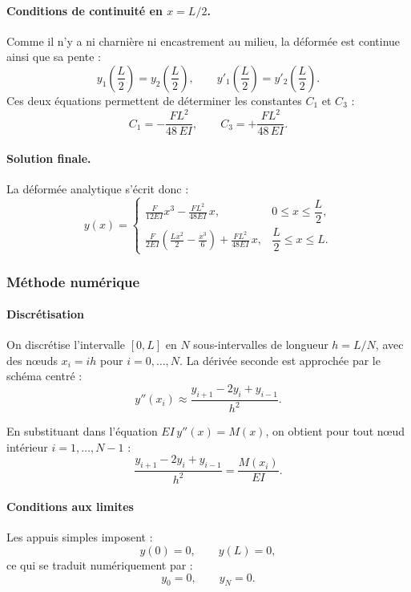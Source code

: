 \documentclass[12pt, a4paper]{article}
\begin{document}
\paragraph{Conditions de continuité en $x=L/2$.}
Comme il n'y a ni charnière ni encastrement au milieu, la déformée est continue ainsi que sa pente :
\[
y_1\!\left(\frac{L}{2}\right)=y_2\!\left(\frac{L}{2}\right),\qquad
y'_1\!\left(\frac{L}{2}\right)=y'_2\!\left(\frac{L}{2}\right).
\]
Ces deux équations permettent de déterminer les constantes $C_1$ et $C_3$ :
\[
C_1 = -\frac{F L^2}{48\,EI},
\qquad
C_3 = +\frac{F L^2}{48\,EI}.
\]

\paragraph{Solution finale.}
La déformée analytique s’écrit donc :
\[
y(x)=
\begin{cases}
\displaystyle
\frac{F}{12EI}x^{3}
-\frac{F L^{2}}{48EI}\,x,
& 0\le x\le \dfrac{L}{2},
\\[12pt]
\displaystyle
\frac{F}{2EI}\left(\frac{Lx^{2}}{2}-\frac{x^{3}}{6}\right)
+\frac{F L^{2}}{48EI}\,x,
& \dfrac{L}{2}\le x\le L.
\end{cases}
\]

\subsubsection{\textbf{Méthode numérique}}

\paragraph{Discrétisation}

On discrétise l’intervalle $[0,L]$ en $N$ sous-intervalles de longueur $h=L/N$,
avec des nœuds $x_i = ih$ pour $i=0,\dots,N$.
La dérivée seconde est approchée par le schéma centré :
\[
y''(x_i) \approx \frac{y_{i+1}-2y_i+y_{i-1}}{h^2}.
\]

En substituant dans l’équation $EI\,y''(x)=M(x)$, on obtient pour
tout nœud intérieur $i=1,\dots,N-1$ :
\[
\frac{y_{i+1}-2y_i+y_{i-1}}{h^2}
= \frac{M(x_i)}{EI}.
\]

\paragraph{Conditions aux limites}

Les appuis simples imposent :
\[
y(0)=0, \qquad y(L)=0,
\]
ce qui se traduit numériquement par :
\[
y_0 = 0, \qquad y_N = 0.
\]
\end{document}
